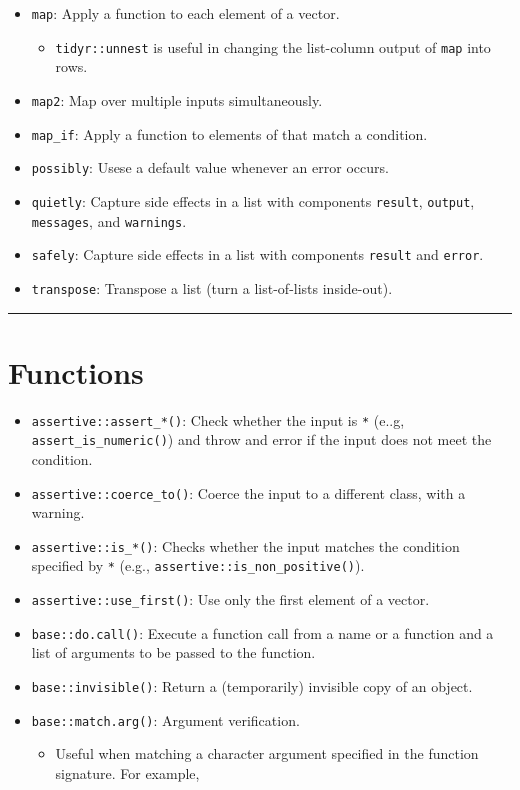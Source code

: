 \documentclass[
]{book}
\providecommand{\tightlist}{%
  \setlength{\itemsep}{0pt}\setlength{\parskip}{0pt}}
\begin{document}
\begin{itemize}
\tightlist
\item
  \texttt{map}: Apply a function to each element of a vector.

  \begin{itemize}
  \tightlist
  \item
    \texttt{tidyr::unnest} is useful in changing the list-column output of \texttt{map} into rows.
  \end{itemize}
\item
  \texttt{map2}: Map over multiple inputs simultaneously.
\item
  \texttt{map\_if}: Apply a function to elements of that match a condition.
\item
  \texttt{possibly}: Usese a default value whenever an error occurs.
\item
  \texttt{quietly}: Capture side effects in a list with components \texttt{result}, \texttt{output}, \texttt{messages}, and \texttt{warnings}.
\item
  \texttt{safely}: Capture side effects in a list with components \texttt{result} and \texttt{error}.
\item
  \texttt{transpose}: Transpose a list (turn a list-of-lists inside-out).
\end{itemize}

\begin{center}\rule{0.5\linewidth}{0.5pt}\end{center}

\hypertarget{functions}{%
\section{Functions}\label{functions}}

\begin{itemize}
\tightlist
\item
  \texttt{assertive::assert\_*()}: Check whether the input is \texttt{*} (e..g, \texttt{assert\_is\_numeric()}) and throw and error if the input does not meet the condition.
\item
  \texttt{assertive::coerce\_to()}: Coerce the input to a different class, with a warning.
\item
  \texttt{assertive::is\_*()}: Checks whether the input matches the condition specified by \texttt{*} (e.g., \texttt{assertive::is\_non\_positive()}).
\item
  \texttt{assertive::use\_first()}: Use only the first element of a vector.
\item
  \texttt{base::do.call()}: Execute a function call from a name or a function and a list of arguments to be passed to the function.
\item
  \texttt{base::invisible()}: Return a (temporarily) invisible copy of an object.
\item
  \texttt{base::match.arg()}: Argument verification.

  \begin{itemize}
  \tightlist
  \item
    Useful when matching a character argument specified in the function signature. For example,
  \end{itemize}
\end{itemize}
\end{document}

